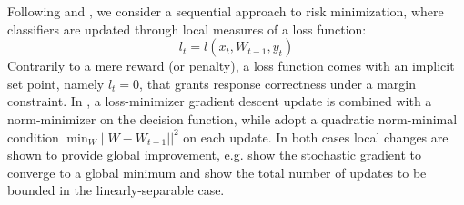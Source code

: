 \documentclass[preprint,12pt,authoryear]{elsarticle}
\begin{document}
Following   \cite{kivinen2004online} and \cite{crammer2006online}, we consider a sequential approach to risk minimization,
where classifiers are updated through local measures of a loss function: 
$$l_t = l(x_t,W_{t-1},y_t)$$
 Contrarily to a mere reward (or penalty), a loss function comes with an implicit set point, namely $l_t=0$, that grants response correctness under a margin constraint. In \cite{kivinen2004online}, a loss-minimizer gradient descent update is combined with a norm-minimizer on the decision function, while \cite{crammer2006online} adopt a quadratic norm-minimal condition $\min_W ||W - W_{t-1}||^2$ on each update. In both cases local changes are shown to provide global improvement, e.g. \cite{kivinen2004online} show the stochastic gradient to converge to a global minimum and \cite{crammer2006online} show the total number of updates to be bounded in the linearly-separable case.

\end{document}
